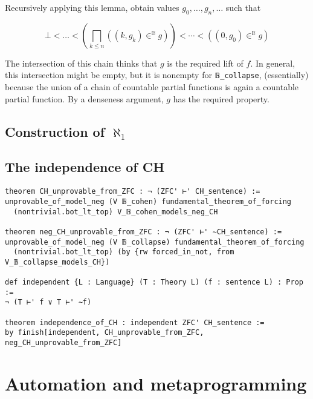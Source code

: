 \documentclass[sigplan,10pt,review, anonymous]{acmart}
\theoremstyle{definition}
\begin{document}
Recursively applying this lemma, obtain values \(g_0, \dots, g_n, \dots\) such that

\[\bot < \dots < \left(\bigsqcap_{k \leq n} ((k, g_k) \in^{\mathbb{B}} g)\right) < \cdots < ((0 , g_0) \in^{\mathbb{B}} g)\]

The intersection of this chain thinks that \(g\) is the required lift of \(f\). In general, this intersection might be empty, but it is nonempty for \lstinline{𝔹_collapse}, (essentially) because the union of a chain of countable partial functions is again a countable partial function. By a denseness argument, \(g\) has the required property.


\subsection{Construction of $\aleph_1$} \label{subsection:forcing:aleph-1}


\subsection{The independence of CH} \label{subsection:forcing:independence}

\begin{lstlisting}
theorem CH_unprovable_from_ZFC : ¬ (ZFC' ⊢' CH_sentence) :=
unprovable_of_model_neg (V 𝔹_cohen) fundamental_theorem_of_forcing
  (nontrivial.bot_lt_top) V_𝔹_cohen_models_neg_CH

theorem neg_CH_unprovable_from_ZFC : ¬ (ZFC' ⊢' ∼CH_sentence) :=
unprovable_of_model_neg (V 𝔹_collapse) fundamental_theorem_of_forcing
  (nontrivial.bot_lt_top) (by {rw forced_in_not, from V_𝔹_collapse_models_CH})

def independent {L : Language} (T : Theory L) (f : sentence L) : Prop :=
¬ (T ⊢' f ∨ T ⊢' ∼f)

theorem independence_of_CH : independent ZFC' CH_sentence :=
by finish[independent, CH_unprovable_from_ZFC, neg_CH_unprovable_from_ZFC]
\end{lstlisting}

\section{Automation and metaprogramming}
\label{section:metaprogramming}
\end{document}
